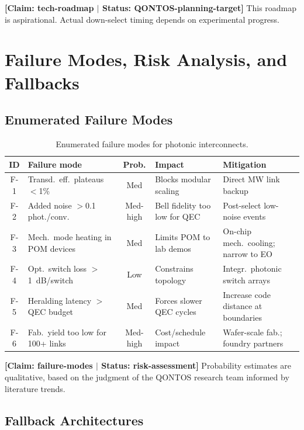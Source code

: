 \documentclass[conference]{IEEEtran}
\begin{document}
\textbf{[Claim: tech-roadmap $|$ Status: QONTOS-planning-target]} This roadmap is aspirational. Actual down-select timing depends on experimental progress.

\section{Failure Modes, Risk Analysis, and Fallbacks}

\subsection{Enumerated Failure Modes}

\begin{table}[H]
\centering
\caption{Enumerated failure modes for photonic interconnects.}
\label{tab:failure-modes}
\footnotesize
\begin{tabularx}{\columnwidth}{cL{2.0cm}cL{1.5cm}L{2.0cm}}
\toprule
\textbf{ID} & \textbf{Failure mode} & \textbf{Prob.} & \textbf{Impact} & \textbf{Mitigation} \\
\midrule
F-1 & Transd.\ eff.\ plateaus $<$1\% & Med & Blocks modular scaling & Direct MW link backup \\
F-2 & Added noise $>$0.1 phot./conv. & Med-high & Bell fidelity too low for QEC & Post-select low-noise events \\
F-3 & Mech.\ mode heating in POM devices & Med & Limits POM to lab demos & On-chip mech.\ cooling; narrow to EO \\
F-4 & Opt.\ switch loss $>$1~dB/switch & Low & Constrains topology & Integr.\ photonic switch arrays \\
F-5 & Heralding latency $>$ QEC budget & Med & Forces slower QEC cycles & Increase code distance at boundaries \\
F-6 & Fab.\ yield too low for 100+ links & Med-high & Cost/schedule impact & Wafer-scale fab.; foundry partners \\
\bottomrule
\end{tabularx}
\end{table}

\textbf{[Claim: failure-modes $|$ Status: risk-assessment]} Probability estimates are qualitative, based on the judgment of the QONTOS research team informed by literature trends.

\subsection{Fallback Architectures}
\end{document}
